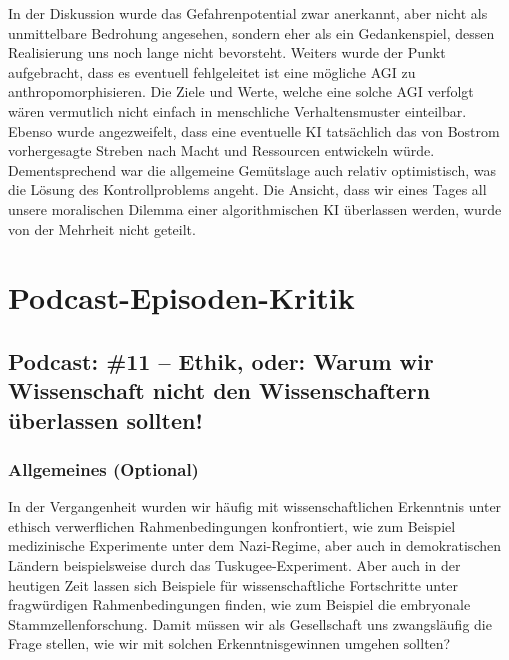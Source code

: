 \documentclass[twoside, a4paper, DIV=11, open=any, bibliography=totoc]{scrbook}
\begin{document}
In der Diskussion wurde das Gefahrenpotential zwar anerkannt, aber
nicht als unmittelbare Bedrohung angesehen, sondern eher als ein Gedankenspiel,
dessen Realisierung uns noch lange nicht bevorsteht.
Weiters wurde der Punkt aufgebracht, dass es eventuell fehlgeleitet ist
eine mögliche AGI zu anthropomorphisieren.
Die Ziele und Werte, welche eine solche AGI verfolgt wären vermutlich nicht
einfach in menschliche Verhaltensmuster einteilbar.
Ebenso wurde angezweifelt, dass eine eventuelle KI tatsächlich das von
Bostrom vorhergesagte Streben nach Macht und Ressourcen entwickeln würde. 
Dementsprechend war die allgemeine Gemütslage auch relativ optimistisch,
was die Lösung des Kontrollproblems angeht. 
Die Ansicht, dass wir eines Tages all unsere moralischen Dilemma einer
algorithmischen KI überlassen werden, wurde von der Mehrheit nicht geteilt.





\chapter{Podcast-Episoden-Kritik} \label{chap:podkrit}


\section{Podcast: \#11 -- Ethik, oder: Warum wir Wissenschaft nicht den Wissenschaftern überlassen sollten!}

\subsection{Allgemeines (Optional)}

In der Vergangenheit wurden wir häufig mit wissenschaftlichen Erkenntnis unter
ethisch verwerflichen Rahmenbedingungen konfrontiert, wie zum Beispiel medizinische
Experimente unter dem Nazi-Regime, aber auch in demokratischen Ländern beispielsweise durch das Tuskugee-Experiment.
Aber auch in der heutigen Zeit lassen sich Beispiele für wissenschaftliche Fortschritte
unter fragwürdigen Rahmenbedingungen finden, wie zum Beispiel die embryonale Stammzellenforschung.
Damit müssen wir als Gesellschaft uns zwangsläufig die Frage stellen, wie wir mit solchen Erkenntnisgewinnen
umgehen sollten?

%
\end{document}
